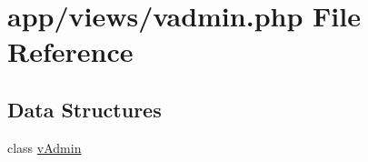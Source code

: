 \hypertarget{vadmin_8php}{}\section{app/views/vadmin.php File Reference}
\label{vadmin_8php}
\subsection*{Data Structures}
\begin{DoxyCompactItemize}
\item 
class \hyperlink{classvAdmin}{v\+Admin}
\end{DoxyCompactItemize}
